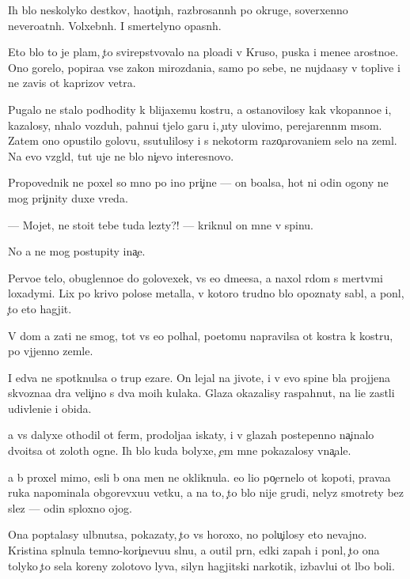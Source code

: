 \documentclass[10pt]{book}
\begin{document}
Ih b{\yi}lo neskolyko des{\ia}tkov, haoti{\c}n{\yi}h, razbrosann{\yi}h po okruge, soverxenno nevero{\y}atn{\yi}h. Volxebn{\yi}h. I smertelyno opasn{\yi}h.

Eto b{\yi}lo to je plam{\ia}, {\c}to svirepstvovalo na plo{\x}adi v Kruso, puska{\y} i mene{\y}e {\y}arostno{\y}e. Ono gorelo, popira{\y}a vse zakon{\yi} mirozdani{\y}a, samo po sebe, ne nujda{\y}asy v toplive i ne zavis{\ia} ot kaprizov vetra.

Pugalo ne stalo podhodity k blija{\y}xemu kostru, a ostanovilosy kak vkopanno{\y}e i, kazalosy, n{\iu}halo vozduh, pahnu{\x}i{\y} t{\ia}jelo{\y} gar{\y}u i, {\c}uty ulovimo, perejarenn{\yi}m m{\ia}som. Zatem ono opustilo golovu, ssutulilosy i s nekotor{\yi}m razo{\c}arovani{\y}em selo na zeml{\iu}. Na {\y}evo vzgl{\ia}d, tut uje ne b{\yi}lo ni{\c}evo interesnovo.

Propovednik ne poxel so mno{\y} po ino{\y} pri{\c}ine — on bo{\y}alsa, hot{\ia} ni odin ogony ne mog pri{\c}inity duxe vreda.

— Mojet, ne sto{\y}it tebe tuda lezty?! — kriknul on mne v spinu.

No {\y}a ne mog postupity ina{\c}e.

Pervo{\y}e telo, obuglenno{\y}e do golovexek, vs{\e} {\y}e{\x}o d{\yi}m{\ia}{\x}e{\y}esa, {\y}a naxol r{\ia}dom s mertv{\yi}mi loxadymi. Lix po krivo{\y} polose metalla, v kotoro{\y} trudno b{\yi}lo opoznaty sabl{\iu}, {\y}a pon{\ia}l, {\c}to eto hagjit.

V dom {\y}a za{\y}ti ne smog, tot vs{\e} {\y}e{\x}o pol{\yi}hal, poetomu napravilsa ot kostra k kostru, po v{\yi}jjenno{\y} zemle.

I {\y}edva ne spotknulsa o trup {\C}ezare. On lejal na jivote, i v {\y}evo spine b{\yi}la projjena skvozna{\y}a d{\yi}ra veli{\c}ino{\y} s dva mo{\y}ih kulaka. Glaza okazalisy raspahnut{\yi}, na li{\q}e zast{\yi}li udivleni{\y}e i obida.

{\Y}a vs{\e} dalyxe othodil ot ferm{\yi}, prodolja{\y}a iskaty, i v glazah postepenno na{\c}inalo dvo{\y}itsa ot zolot{\yi}h ogne{\y}. Ih b{\yi}lo kuda bolyxe, {\c}em mne pokazalosy vna{\c}ale.

{\Y}a b{\yi} proxel mimo, {\y}esli b{\yi} ona men{\ia} ne okliknula. {\y}e{\y}o li{\q}o po{\c}ernelo ot kopoti, prava{\y}a ruka napominala obgorevxu{\y}u vetku, a na to, {\c}to b{\yi}lo nije grudi, nelyz{\ia} smotrety bez slez — odin sploxno{\y} ojog.

Ona pop{\yi}talasy ul{\yi}bnutsa, pokazaty, {\c}to vs{\e} horoxo, no polu{\c}ilosy eto nevajno. Kristina spl{\iu}nula temno-kori{\c}nevu{\y}u sl{\iu}nu, {\y}a o{\x}util pr{\ia}n{\yi}{\y}, {\y}edki{\y} zapah i pon{\ia}l, {\c}to ona tolyko {\c}to s{\y}ela koreny zolotovo lyva, silyn{\yi}{\y} hagjitski{\y} narkotik, izbavl{\ia}{\y}u{\x}i{\y} ot l{\iu}bo{\y} boli.
\end{document}
